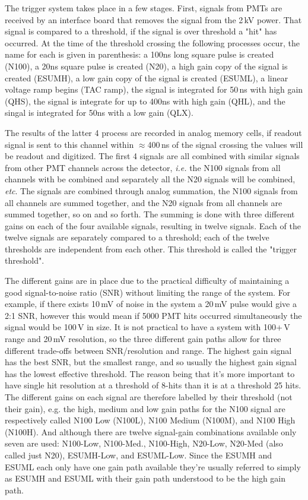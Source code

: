 The trigger system takes place in a few stages.
First, signals from PMTs are received by an interface board that
removes the signal from the 2\,kV power.
That signal is compared to a threshold, if the signal is over threshold a "hit"
has occurred.
At the time of the threshold crossing the following processes occur, the name for each is given
in parenthesis:
a 100ns long square pulse is created (N100), a 20ns square pulse is created (N20),
a high gain copy of the signal is created (ESUMH), a low gain copy of the signal
is created (ESUML), a linear voltage ramp begins (TAC ramp), the signal is integrated for
50\,ns with high gain (QHS), the signal is integrate for up to 400ns with high gain (QHL),
and the singal is integrated for 50ns with a low gain (QLX).

The results of the latter 4 process are recorded in analog memory cells,
if readout signal is sent to this channel within $\approx$400\,ns of the
signal crossing the values will be readout and digitized.
The first 4 signals are all combined with similar signals from
other PMT channels across the detector, \textit{i.e.} the N100 signals
from all channels with be combined and separately all the
N20 signals will be combined, \textit{etc}.
The signals are combined through analog summation, the N100 signals
from all channels are summed together, and the N20 signals from all channels are
summed together, so on and so forth.
The summing is done with three different gains on each of the
four available signals, resulting in twelve signals.
Each of the twelve signals are separately compared to a threshold;
each of the twelve thresholds are independent from each other.
This threshold is called the "trigger threshold".

The different gains are in place due to the practical difficulty of maintaining
a good signal-to-noise ratio (SNR) without limiting the range of the
system.
For example, if there exists 10\,mV of noise in the system a 20\,mV pulse
would give a 2:1 SNR, however this would mean if 5000 PMT hits occurred simultaneously
the signal would be 100\,V in size.
It is not practical to have a system with 100+\,V range and 20\,mV resolution,
so the three different gain paths allow for three different trade-offs between
SNR/resolution and range.
The highest gain signal has the best SNR, but the smallest range, and so usually
the highest gain signal has the lowest effective threshold.
The reason being that it's more important to have single hit resolution at a threshold
of 8-hits than it is at a threshold 25 hits.
The different gains on each signal are therefore labelled by their threshold (not their gain), e.g.
the high, medium and low gain paths for the N100 signal are respectively called
N100 Low (N100L), N100 Medium (N100M), and N100 High (N100H).
And although there are twelve signal-gain combinations available only seven are
used: N100-Low, N100-Med., N100-High, N20-Low, N20-Med (also called just N20), ESUMH-Low, and ESUML-Low.
Since the ESUMH and ESUML each only have one gain path available they're usually
referred to simply as ESUMH and ESUML with their gain path understood to be
the high gain path.

